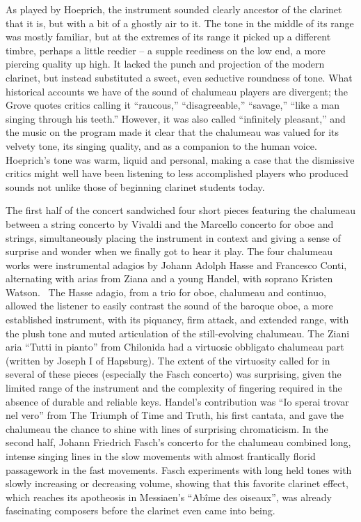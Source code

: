 As played by Hoeprich, the instrument sounded clearly ancestor of the clarinet that it is, but with a bit of a ghostly air to it. The tone in the middle of its range was mostly familiar, but at the extremes of its range it picked up a different timbre, perhaps a little reedier – a supple reediness on the low end, a more piercing quality up high. It lacked the punch and projection of the modern clarinet, but instead substituted a sweet, even seductive roundness of tone. What historical accounts we have of the sound of chalumeau players are divergent; the Grove quotes critics calling it “raucous,” “disagreeable,” “savage,” “like a man singing through his teeth.” However, it was also called “infinitely pleasant,” and the music on the program made it clear that the chalumeau was valued for its velvety tone, its singing quality, and as a companion to the human voice. Hoeprich’s tone was warm, liquid and personal, making a case that the dismissive critics might well have been listening to less accomplished players who produced sounds not unlike those of beginning clarinet students today.

The first half of the concert sandwiched four short pieces featuring the chalumeau between a string concerto by Vivaldi and the Marcello concerto for oboe and strings, simultaneously placing the instrument in context and giving a sense of surprise and wonder when we finally got to hear it play. The four chalumeau works were instrumental adagios by Johann Adolph Hasse and Francesco Conti, alternating with arias from Ziana and a young Handel, with soprano Kristen Watson.  The Hasse adagio, from a trio for oboe, chalumeau and continuo, allowed the listener to easily contrast the sound of the baroque oboe, a more established instrument, with its piquancy, firm attack, and extended range, with the plush tone and muted articulation of the still-evolving chalumeau. The Ziani aria “Tutti in pianto” from Chilonida had a virtuosic obbligato chalumeau part (written by Joseph I of Hapsburg). The extent of the virtuosity called for in several of these pieces (especially the Fasch concerto) was surprising, given the limited range of the instrument and the complexity of fingering required in the absence of durable and reliable keys. Handel’s contribution was “Io sperai trovar nel vero” from The Triumph of Time and Truth, his first cantata, and gave the chalumeau the chance to shine with lines of surprising chromaticism. In the second half, Johann Friedrich Fasch’s concerto for the chalumeau combined long, intense singing lines in the slow movements with almost frantically florid passagework in the fast movements. Fasch experiments with long held tones with slowly increasing or decreasing volume, showing that this favorite clarinet effect, which reaches its apotheosis in Messiaen’s “Abîme des oiseaux”, was already fascinating composers before the clarinet even came into being.

